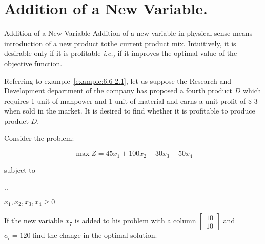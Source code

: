 
\section{Addition of a New Variable.}
\label{sec:addition-new-variable}


\begin{frame}{Addition of a New Variable}{}
  Addition of a new variable in physical sense means introduction of a new product tothe current product mix. Intuitively, it is desirable only if it is profitable \emph{i.e.,} if it improves the optimal value of the objective function.


\end{frame}

  \begin{frameExample}{}{}
    Referring to example~\ref{example:6.6-2.1}, let us suppose the Research and Development department of the company has proposed a fourth product $D$ which requires 1 unit of manpower and 1 unit of material and earns a unit profit of \$ 3 when sold in the market. It is desired to find whether it is profitable to produce product $D$.
  \end{frameExample}

  \begin{frameExample}{\label{example:6.6-3.2}}{}
    Consider the problem: 

    \[ \max Z = 45x_1 +100x_2 +30x_3 + 50x_4 \]

    subject to
    
    {\centering
  \sysdelim..%

  \vspace{5mm}
  $x_1, x_2, x_3,x_4 \geq 0$    
  \par}

If the new variable $x_7$ is added to his problem with a column $
\begin{bmatrix}
  10\\10
\end{bmatrix}
$ %
and $c_7 = 120$ find the change in the optimal solution.
  \end{frameExample}


